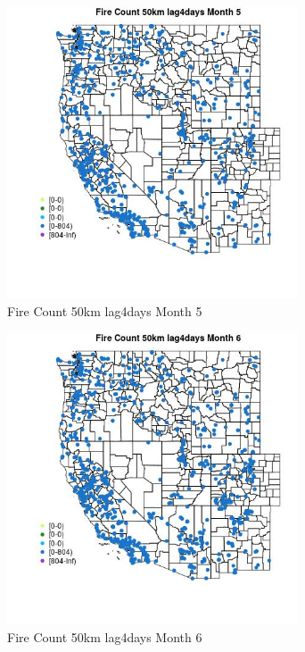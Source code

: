 \begin{figure} 
\centering  
\includegraphics[width=0.77\textwidth]{Code_Outputs/Report_ML_input_PM25_Step4_part_f_de_duplicated_aves_prioritize_24hr_obswNAs_MapObsMo5Fire_Count_50km_lag4days.jpg} 
\caption{\label{fig:Report_ML_input_PM25_Step4_part_f_de_duplicated_aves_prioritize_24hr_obswNAsMapObsMo5Fire_Count_50km_lag4days}Fire Count 50km lag4days Month 5} 
\end{figure} 
 

\begin{figure} 
\centering  
\includegraphics[width=0.77\textwidth]{Code_Outputs/Report_ML_input_PM25_Step4_part_f_de_duplicated_aves_prioritize_24hr_obswNAs_MapObsMo6Fire_Count_50km_lag4days.jpg} 
\caption{\label{fig:Report_ML_input_PM25_Step4_part_f_de_duplicated_aves_prioritize_24hr_obswNAsMapObsMo6Fire_Count_50km_lag4days}Fire Count 50km lag4days Month 6} 
\end{figure} 
 

